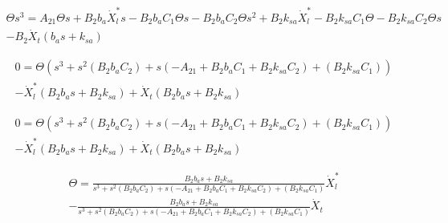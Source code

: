 \documentclass{article}
\begin{document}
            \begin{equation}
                \begin{split}
                \Theta s^3 =  A_{21} \Theta s + B_{2}b_a \dot{X}_l^* s- B_{2}b_a C_1 \Theta s -B_{2}b_a C_2 \Theta s^2 + B_{2}k_{sa} \dot{X}_l^* - B_{2}k_{sa} C_1 \Theta - B_{2}k_{sa} C_2 \Theta s \\
                - B_{2}\dot{X}_t\left(b_a s+k_{sa}\right)
                \end{split}
            \end{equation}

            \begin{equation}
                \begin{split}
                0= \Theta \left( s^3 + s^2 \left(B_{2}b_a C_2\right) + s \left(-A_{21} +B_{2}b_a C_1 +B_{2}k_{sa} C_2 \right) + \left( B_{2}k_{sa} C_1 \right) \right)\\
                - \dot{X}_l^*\left(B_{2}b_a s + B_{2}k_{sa}\right) +\dot{X}_t\left(B_{2}b_a s+B_{2}k_{sa}\right)   
                \end{split}
            \end{equation}

            \begin{equation}
                \begin{split}
                0= \Theta \left( s^3 + s^2 \left(B_{2}b_a C_2\right) + s \left(-A_{21} +B_{2}b_a C_1 +B_{2}k_{sa} C_2 \right) + \left( B_{2}k_{sa} C_1 \right) \right)\\
                - \dot{X}_l^*\left(B_{2}b_a s + B_{2}k_{sa}\right) +\dot{X}_t\left(B_{2}b_a s+B_{2}k_{sa}\right)   
                \end{split}
            \end{equation}


            \begin{equation}
                \begin{split}
                    \Theta= \frac{B_{2}b_a s + B_{2}k_{sa}}{s^3 + s^2 \left(B_{2}b_a C_2\right) + s \left(-A_{21} +B_{2}b_a C_1 +B_{2}k_{sa} C_2 \right) + \left( B_{2}k_{sa} C_1 \right)} \dot{X}_l^*\\
                    - \frac{B_{2}b_a s+B_{2}k_{sa}}{s^3 + s^2 \left(B_{2}b_a C_2\right) + s \left(-A_{21} +B_{2}b_a C_1 +B_{2}k_{sa} C_2 \right) + \left( B_{2}k_{sa} C_1 \right)} \dot{X}_t
                \end{split}
            \end{equation}
\end{document}
